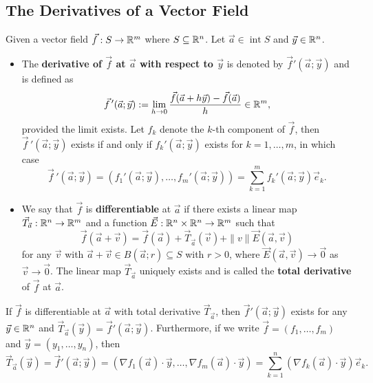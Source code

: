 \documentclass[a4paper]{ctexart}
\begin{document}
    \subsection{The Derivatives of a Vector Field}
    \begin{mydef}
        Given a vector field $\vec f:S\to \mathbb{R}^m$ where $S\subseteq \mathbb{R}^n$. Let $\vec a \in \operatorname{int} S$ and $\vec y \in \mathbb{R}^n$.
        \begin{itemize}
            \item The \textbf{derivative of $\vec f$ at $\vec a$ with respect to $\vec y$} is denoted by $\vec f'(\vec a; \vec y)$ and is defined as
            $$ \vec{f}\,'(\vec a; \vec y) := \lim_{h\to 0} \frac{\vec f(\vec a + h \vec y) - \vec f(\vec a)}{h}\in \mathbb{R}^m, $$
            provided the limit exists. Let $f_k$ denote the $k$-th component of $\vec f$, then $\vec f\,'(\vec a; \vec y) $ exists if and only if $f_k'(\vec a; \vec y)$ exists for $k=1, \ldots, m$, in which case $$\vec f\,'(\vec a; \vec y) = (f_1'(\vec a; \vec y), \ldots, f_m'(\vec a; \vec y))=\sum_{k=1}^m f_k'(\vec a; \vec y) \vec e_k.$$        
            \item We say that $\vec f$ is \textbf{differentiable} at $\vec a$ if there exists a linear map $\vec T_{\vec a}:\mathbb{R}^n \to \mathbb{R}^m$ and a function $\vec E:\mathbb{R}^n \times \mathbb{R}^n \to \mathbb{R}^m$ such that
            $$ \vec f(\vec a + \vec v) = \vec f(\vec a) + \vec T_{\vec a}(\vec v) + \|v\| \vec E(\vec a, \vec v) $$
            for any $\vec v$ with $\vec a + \vec v \in B(\vec a;r)\subseteq S$ with $r>0$, where $\vec E(\vec a, \vec v) \to \vec 0$ as $\vec v \to \vec 0$. The linear map $\vec T_{\vec a}$ uniquely exists and is called the \textbf{total derivative} of $\vec f$ at $\vec a$.
        \end{itemize}
    \end{mydef}
    \begin{mythm}
        If $\vec f$ is differentiable at $\vec a$ with total derivative $\vec T_{\vec a}$, then $\vec f'(\vec a; \vec y)$ exists for any $\vec y\in \mathbb{R}^n$ and $\vec T_{\vec a}(\vec y) = \vec f'(\vec a; \vec y)$. Furthermore, if we write $\vec f = (f_1, \ldots, f_m)$ and $\vec y = (y_1, \ldots, y_n)$, then
        $$ \vec T_{\vec a}(\vec y) = \vec f'(\vec a; \vec y) = \left( \nabla f_1(\vec a) \cdot \vec y, \ldots, \nabla f_m(\vec a) \cdot \vec y \right) = \sum_{k=1}^n \left( \nabla f_k (\vec a) \cdot \vec y \right) \vec e_k. $$
    \end{mythm}
\end{document}

